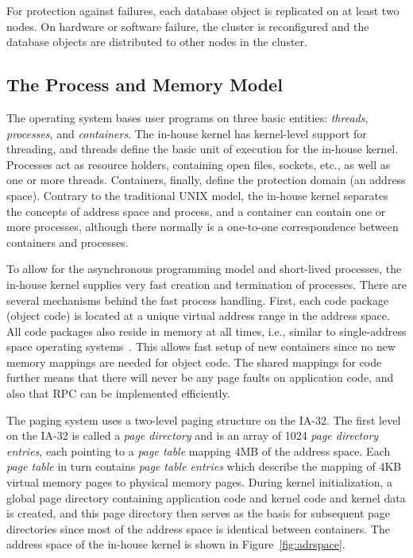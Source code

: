 For protection against failures, each database object is replicated on at
least two nodes. On hardware or software failure, the cluster is reconfigured
and the database objects are distributed to other nodes in the cluster.


\subsection{The Process and Memory Model}
\label{sec:tsp:processes}
The operating system bases user programs on three basic entities:
\emph{threads}, \emph{processes}, and \emph{containers}. The in-house kernel
has kernel-level support for threading, and threads define the basic unit of
execution for the in-house kernel.  Processes act as resource holders,
containing open files, sockets, etc., as well as one or more threads.
Containers, finally, define the protection domain (an address space). Contrary
to the traditional UNIX model, the in-house kernel separates the concepts of
address space and process, and a container can contain one or more processes,
although there normally is a one-to-one correspondence between containers and
processes.

To allow for the asynchronous programming model and short-lived processes, the
in-house kernel supplies very fast creation and termination of processes.
There are several mechanisms behind the fast process handling. First, each
code package (object code) is located at a unique virtual address range in the
address space. All code packages also reside in memory at all times, i.e.,
similar to single-address space operating systems~\cite{chase92how,heiser98mungi}.
This allows fast setup of new containers since no new
memory mappings are needed for object code. The shared mappings for code
further means that there will never be any page faults on application code,
and also that RPC can be implemented efficiently.

The paging system uses a two-level paging structure on the IA-32.  The first
level on the IA-32 is called a \emph{page directory} and is an array of 1024
\emph{page directory entries}, each pointing to a \emph{page table} mapping
4MB of the address space. Each \emph{page table} in turn contains \emph{page
  table entries} which describe the mapping of 4KB virtual memory pages to
physical memory pages. During kernel initialization, a global page directory
containing application code and kernel code and kernel data is created, and
this page directory then serves as the basis for subsequent page directories
since most of the address space is identical between containers.  The address
space of the in-house kernel is shown in Figure~\ref{fig:adrspace}.


